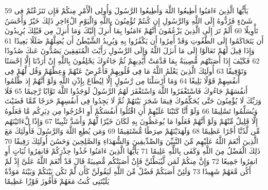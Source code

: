 {\tiny\colorbox{cl_aya}{59}} يَأَيُّهَا الَّذِينَ ءَامَنُوا أَطِيعُوا اللَّهَ وَأَطِيعُوا الرَّسُولَ وَأُولِى الْأَمْرِ مِنكُمْ فَإِن تَنَزَعْتُمْ فِى شَىْءٍ فَرُدُّوهُ إِلَى اللَّهِ وَالرَّسُولِ إِن كُنتُمْ تُؤْمِنُونَ بِاللَّهِ وَالْيَوْمِ الْءَاخِرِ ذَلِكَ خَيْرٌ وَأَحْسَنُ تَأْوِيلًا
{\tiny\colorbox{cl_aya}{60}} أَلَمْ تَرَ إِلَى الَّذِينَ يَزْعُمُونَ أَنَّهُمْ ءَامَنُوا بِمَا أُنزِلَ إِلَيْكَ وَمَا أُنزِلَ مِن قَبْلِكَ يُرِيدُونَ أَن يَتَحَاكَمُوا إِلَى الطَّغُوتِ وَقَدْ أُمِرُوا أَن يَكْفُرُوا بِهِ وَيُرِيدُ الشَّيْطَنُ أَن يُضِلَّهُمْ ضَلَلًا بَعِيدًا
{\tiny\colorbox{cl_aya}{61}} وَإِذَا قِيلَ لَهُمْ تَعَالَوْا إِلَى مَا أَنزَلَ اللَّهُ وَإِلَى الرَّسُولِ رَأَيْتَ الْمُنَفِقِينَ يَصُدُّونَ عَنكَ صُدُودًا
{\tiny\colorbox{cl_aya}{62}} فَكَيْفَ إِذَا أَصَبَتْهُم مُّصِيبَةٌ بِمَا قَدَّمَتْ أَيْدِيهِمْ ثُمَّ جَاءُوكَ يَحْلِفُونَ بِاللَّهِ إِنْ أَرَدْنَا إِلَّا إِحْسَنًا وَتَوْفِيقًا
{\tiny\colorbox{cl_aya}{63}} أُولَئِكَ الَّذِينَ يَعْلَمُ اللَّهُ مَا فِى قُلُوبِهِمْ فَأَعْرِضْ عَنْهُمْ وَعِظْهُمْ وَقُل لَّهُمْ فِى أَنفُسِهِمْ قَوْلًا بَلِيغًا
{\tiny\colorbox{cl_aya}{64}} وَمَا أَرْسَلْنَا مِن رَّسُولٍ إِلَّا لِيُطَاعَ بِإِذْنِ اللَّهِ وَلَوْ أَنَّهُمْ إِذ ظَّلَمُوا أَنفُسَهُمْ جَاءُوكَ فَاسْتَغْفَرُوا اللَّهَ وَاسْتَغْفَرَ لَهُمُ الرَّسُولُ لَوَجَدُوا اللَّهَ تَوَّابًا رَّحِيمًا
{\tiny\colorbox{cl_aya}{65}} فَلَا وَرَبِّكَ لَا يُؤْمِنُونَ حَتَّى يُحَكِّمُوكَ فِيمَا شَجَرَ بَيْنَهُمْ ثُمَّ لَا يَجِدُوا فِى أَنفُسِهِمْ حَرَجًا مِّمَّا قَضَيْتَ وَيُسَلِّمُوا تَسْلِيمًا
{\tiny\colorbox{cl_aya}{66}} وَلَوْ أَنَّا كَتَبْنَا عَلَيْهِمْ أَنِ اقْتُلُوا أَنفُسَكُمْ أَوِ اخْرُجُوا مِن دِيَرِكُم مَّا فَعَلُوهُ إِلَّا قَلِيلٌ مِّنْهُمْ وَلَوْ أَنَّهُمْ فَعَلُوا مَا يُوعَظُونَ بِهِ لَكَانَ خَيْرًا لَّهُمْ وَأَشَدَّ تَثْبِيتًا
{\tiny\colorbox{cl_aya}{67}} وَإِذًا لَّءَاتَيْنَهُم مِّن لَّدُنَّا أَجْرًا عَظِيمًا
{\tiny\colorbox{cl_aya}{68}} وَلَهَدَيْنَهُمْ صِرَطًا مُّسْتَقِيمًا
{\tiny\colorbox{cl_aya}{69}} وَمَن يُطِعِ اللَّهَ وَالرَّسُولَ فَأُولَئِكَ مَعَ الَّذِينَ أَنْعَمَ اللَّهُ عَلَيْهِم مِّنَ النَّبِيِّنَ وَالصِّدِّيقِينَ وَالشُّهَدَاءِ وَالصَّلِحِينَ وَحَسُنَ أُولَئِكَ رَفِيقًا
{\tiny\colorbox{cl_aya}{70}} ذَلِكَ الْفَضْلُ مِنَ اللَّهِ وَكَفَى بِاللَّهِ عَلِيمًا
{\tiny\colorbox{cl_aya}{71}} يَأَيُّهَا الَّذِينَ ءَامَنُوا خُذُوا حِذْرَكُمْ فَانفِرُوا ثُبَاتٍ أَوِ انفِرُوا جَمِيعًا
{\tiny\colorbox{cl_aya}{72}} وَإِنَّ مِنكُمْ لَمَن لَّيُبَطِّئَنَّ فَإِنْ أَصَبَتْكُم مُّصِيبَةٌ قَالَ قَدْ أَنْعَمَ اللَّهُ عَلَىَّ إِذْ لَمْ أَكُن مَّعَهُمْ شَهِيدًا
{\tiny\colorbox{cl_aya}{73}} وَلَئِنْ أَصَبَكُمْ فَضْلٌ مِّنَ اللَّهِ لَيَقُولَنَّ كَأَن لَّمْ تَكُن بَيْنَكُمْ وَبَيْنَهُ مَوَدَّةٌ يَلَيْتَنِى كُنتُ مَعَهُمْ فَأَفُوزَ فَوْزًا عَظِيمًا
